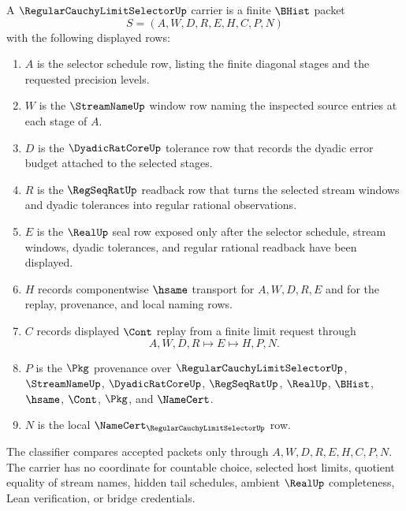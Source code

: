 \begin{definition}
\label{def:regular-cauchy-limit-selector-carrier}
A $\RegularCauchyLimitSelectorUp$ carrier is a finite $\BHist$ packet
$$
S=(A,W,D,R,E,H,C,P,N)
$$
with the following displayed rows:
\begin{enumerate}
\item $A$ is the selector schedule row, listing the finite diagonal stages and the requested precision levels.
\item $W$ is the $\StreamNameUp$ window row naming the inspected source entries at each stage of $A$.
\item $D$ is the $\DyadicRatCoreUp$ tolerance row that records the dyadic error budget attached to the selected stages.
\item $R$ is the $\RegSeqRatUp$ readback row that turns the selected stream windows and dyadic tolerances into regular rational observations.
\item $E$ is the $\RealUp$ seal row exposed only after the selector schedule, stream windows, dyadic tolerances, and regular rational readback have been displayed.
\item $H$ records componentwise $\hsame$ transport for $A,W,D,R,E$ and for the replay, provenance, and local naming rows.
\item $C$ records displayed $\Cont$ replay from a finite limit request through
$$
A,W,D,R \longmapsto E \longmapsto H,P,N .
$$
\item $P$ is the $\Pkg$ provenance over $\RegularCauchyLimitSelectorUp$, $\StreamNameUp$, $\DyadicRatCoreUp$, $\RegSeqRatUp$, $\RealUp$, $\BHist$, $\hsame$, $\Cont$, $\Pkg$, and $\NameCert$.
\item $N$ is the local $\NameCert_{\RegularCauchyLimitSelectorUp}$ row.
\end{enumerate}
The classifier compares accepted packets only through $A,W,D,R,E,H,C,P,N$. The carrier has no coordinate for countable choice, selected host limits, quotient equality of stream names, hidden tail schedules, ambient $\RealUp$ completeness, Lean verification, or bridge credentials.
\end{definition}

